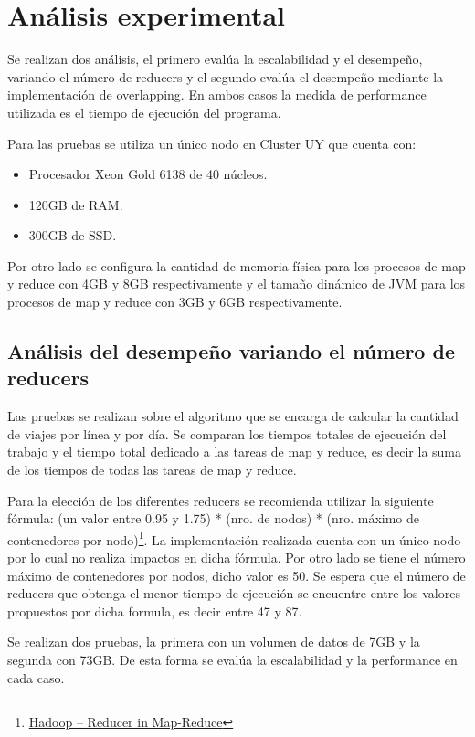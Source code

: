 \documentclass[conference]{IEEEtran}
\begin{document}
\section{Análisis experimental}

Se realizan dos análisis, el primero evalúa la escalabilidad y el desempeño, variando el número de reducers y el segundo evalúa el desempeño mediante la implementación de overlapping. En ambos casos la medida de performance utilizada es el tiempo de ejecución del programa.

Para las pruebas se utiliza un único nodo en Cluster UY \cite{b7} que cuenta con:
\begin{itemize}
    \item Procesador Xeon Gold 6138 de 40 núcleos.
    \item 120GB de RAM.
    \item 300GB de SSD.
\end{itemize}
Por otro lado se configura la cantidad de memoria física para los procesos de map y reduce con 4GB y 8GB respectivamente y el tamaño dinámico de JVM para los procesos de map y reduce con 3GB y 6GB respectivamente.

\subsection{Análisis del desempeño variando el número de reducers}\label{AA}

Las pruebas se realizan sobre el algoritmo que se encarga de calcular la cantidad de viajes por línea y por día. Se comparan los tiempos totales de ejecución del trabajo y el tiempo total dedicado a las tareas de map y reduce, es decir la suma de los tiempos de todas las tareas de map y reduce.

Para la elección de los diferentes reducers se recomienda utilizar la siguiente fórmula: (un valor entre 0.95 y 1.75) * (nro. de nodos) * (nro. máximo de contenedores por nodo)\footnote{\href{https://www.geeksforgeeks.org/hadoop-reducer-in-map-reduce/}{Hadoop – Reducer in Map-Reduce}}. La implementación realizada cuenta con un único nodo por lo cual no realiza impactos en dicha fórmula. Por otro lado se tiene el número máximo de contenedores por nodos, dicho valor es 50.
Se espera que el número de reducers que obtenga el menor tiempo de ejecución se encuentre entre los valores propuestos por dicha formula, es decir entre 47 y 87.

Se realizan dos pruebas, la primera con un volumen de datos de 7GB y la segunda con 73GB. De esta forma se evalúa la escalabilidad y la performance en cada caso.
\end{document}
